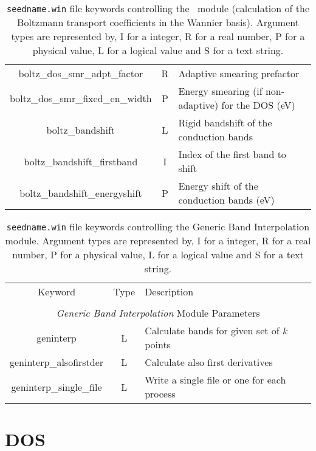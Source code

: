 \begin{table}[hH!]
\begin{center}
\begin{tabular}{|c|c|p{6cm}|}
{\sc boltz\_dos\_smr\_adpt\_factor} & R & Adaptive smearing prefactor\\
{\sc boltz\_dos\_smr\_fixed\_en\_width} & P  & Energy smearing (if non-adaptive) for the DOS (eV) \\
{\sc boltz\_bandshift} & L & Rigid bandshift of the conduction bands\\
{\sc boltz\_bandshift\_firstband} & I & Index of the first band to shift\\
{\sc boltz\_bandshift\_energyshift} & P & Energy shift of the conduction bands (eV)\\
\hline
\end{tabular}
\caption[Parameter file keywords controlling the \bw\ module.]
{{\tt seedname.win} file keywords controlling the \bw\ module (calculation of the Boltzmann transport coefficients in the Wannier basis). Argument types
are represented by, I for a integer, R for a real number, P for a
physical value, L for a logical value and S for a text string.}
\label{parameter_keywords_bw}
\end{center}
\end{table}

\begin{table}[hH!]
\begin{center}
\begin{tabular}{|c|c|p{6cm}|}
\hline
Keyword & Type & Description \\
        &      &             \\
\hline\hline
\multicolumn{3}{|c|}{\emph{Generic Band Interpolation} Module Parameters} \\
\hline
{\sc geninterp}   & L & Calculate bands for given set of $k$ points \\
{\sc geninterp\_alsofirstder} & L & Calculate also first derivatives\\ 
{\sc geninterp\_single\_file} & L & Write a single file or one for each
process\\ 
\hline
\end{tabular}
\caption[Parameter file keywords controlling the Generic Band Interpolation module.]
{{\tt seedname.win} file keywords controlling the Generic Band Interpolation module. Argument types
are represented by, I for a integer, R for a real number, P for a
physical value, L for a logical value and S for a text string.}
\label{parameter_keywords_geninterp}
\end{center}
\end{table}

\clearpage
\section{DOS}
